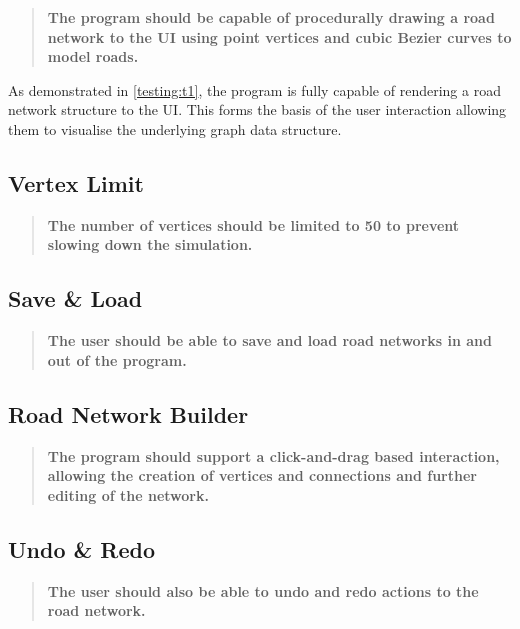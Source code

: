         \begin{quote}
            \textbf{The program should be capable of procedurally drawing a road network to the UI using point vertices and cubic Bezier curves to model roads.}
        \end{quote}

        As demonstrated in \autoref{testing:t1}, the program is fully capable of rendering a road network structure to the UI. This forms the basis of the user interaction allowing them to visualise the underlying graph data structure.

    \subsection{Vertex Limit}

        \begin{quote}
            \textbf{The number of vertices should be limited to 50 to prevent slowing down the simulation.}
        \end{quote}

    \subsection{Save \& Load}

        \begin{quote}
            \textbf{The user should be able to save and load road networks in and out of the program.}
        \end{quote}

    \subsection{Road Network Builder}

        \begin{quote}
            \textbf{The program should support a click-and-drag based interaction, allowing the creation of vertices and connections and further editing of the network.}
        \end{quote}

    \subsection{Undo \& Redo}

        \begin{quote}
            \textbf{The user should also be able to undo and redo actions to the road network.}
        \end{quote}

